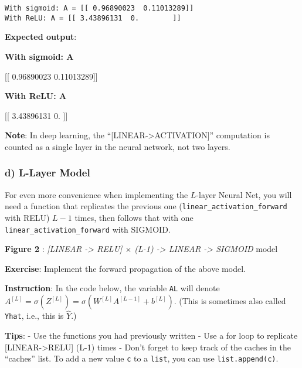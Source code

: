 \documentclass[11pt]{article}
\begin{document}
    \begin{Verbatim}[commandchars=\\\{\}]
With sigmoid: A = [[ 0.96890023  0.11013289]]
With ReLU: A = [[ 3.43896131  0.        ]]

    \end{Verbatim}

    \textbf{Expected output}:

\textbf{With sigmoid: A }

{[}{[} 0.96890023 0.11013289{]}{]}

\textbf{With ReLU: A }

{[}{[} 3.43896131 0. {]}{]}

    \textbf{Note}: In deep learning, the
``{[}LINEAR-\textgreater{}ACTIVATION{]}'' computation is counted as a
single layer in the neural network, not two layers.

    \subsubsection{d) L-Layer Model}\label{d-l-layer-model}

For even more convenience when implementing the $L$-layer Neural Net,
you will need a function that replicates the previous one
(\texttt{linear\_activation\_forward} with RELU) $L-1$ times, then
follows that with one \texttt{linear\_activation\_forward} with SIGMOID.

\textbf{Figure 2} : \emph{{[}LINEAR -\textgreater{} RELU{]} $\times$
(L-1) -\textgreater{} LINEAR -\textgreater{} SIGMOID} model

\textbf{Exercise}: Implement the forward propagation of the above model.

\textbf{Instruction}: In the code below, the variable \texttt{AL} will
denote
$A^{[L]} = \sigma(Z^{[L]}) = \sigma(W^{[L]} A^{[L-1]} + b^{[L]})$. (This
is sometimes also called \texttt{Yhat}, i.e., this is $\hat{Y}$.)

\textbf{Tips}: - Use the functions you had previously written - Use a
for loop to replicate {[}LINEAR-\textgreater{}RELU{]} (L-1) times -
Don't forget to keep track of the caches in the ``caches'' list. To add
a new value \texttt{c} to a \texttt{list}, you can use
\texttt{list.append(c)}.
\end{document}
